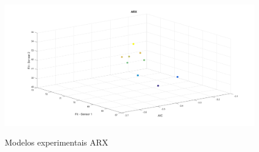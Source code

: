 \begin{figure}[h]
	\caption{Modelos experimentais ARX}
	\begin{center}
		\includegraphics[width=1.00\textwidth]{./5_images/tclabsp-models-ARX.png} 
		\label{fig:tclabsp-models-arx}
	\end{center}
	\centering
\end{figure}

